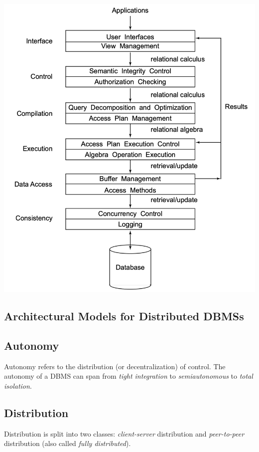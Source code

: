 \documentclass[12pt]{article}
\begin{document}
\includegraphics[width=\textwidth]{assets/functional-layers-of-centralized-dbms.png}

\subsection{Architectural Models for Distributed DBMSs}

\subsection{Autonomy}

Autonomy refers to the distribution (or decentralization) of control. The autonomy of a DBMS can span from \textit{tight integration} to \textit{semiautonomous} to \textit{total isolation}.

\subsection{Distribution}

Distribution is split into two classes: \textit{client-server} distribution and \textit{peer-to-peer} distribution (also called \textit{fully distributed}).
\end{document}
